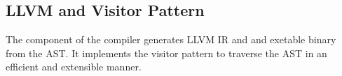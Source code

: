 \subsection{LLVM and Visitor Pattern}
\label{sec:LLVM}

The \codeGen{} component of the compiler generates LLVM IR and and exetable binary
from the AST. It implements the visitor pattern to traverse the AST in an efficient
and extensible manner. 


